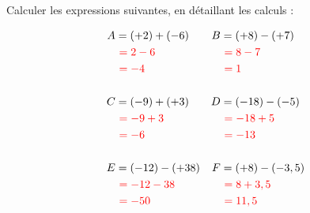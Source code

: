 \documentclass[Controle-correction]{subfiles}
\begin{document}
\maketitle

\begin{exercice}[(3 points)] Calculer les expressions suivantes, en détaillant les calculs :

	\begin{align*}
		A & = (+2) + (-6)             & B & = (+8) - (+7)            \\
		  & \ \correction{= 2 - 6}    &   & \  \correction{= 8 - 7}  \\
		  & \  \correction{= -4}      &   & \  \correction{= 1}      \\
		\\
		C & = (-9) + (+3)             & D & =  (-18) - (-5)          \\
		  & \ \correction{= -9 + 3}   &   & \ \correction{= -18 + 5} \\
		  & \ \correction{= -6}       &   & \ \correction{= -13}     \\
		\\
		E & = (-12) - (+38)           & F & =   (+8) - (-3,5)        \\
		  & \ \correction{= -12 - 38} &   & \ \correction{= 8 + 3,5} \\
		  & \ \correction{= -50}      &   & \ \correction{= 11,5}    \\
	\end{align*}
\end{exercice}
\end{document}
